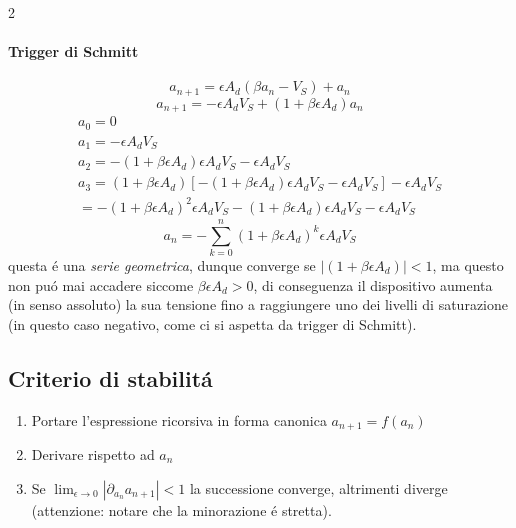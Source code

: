 \begin{multicols}{2}
  \paragraph{Trigger di Schmitt}
  \begin{equation*}
    a_{n+1} = \epsilon A_d(\beta a_n - V_S) + a_n
  \end{equation*}
  \begin{equation*}
    a_{n+1} = -\epsilon A_dV_S + (1 + \beta\epsilon A_d)a_n
  \end{equation*}
  \begin{equation*}
    \begin{gathered}
      a_0 = 0 \\
      a_1 = -\epsilon A_d V_S \\
      a_2 = -(1 + \beta \epsilon A_d)\epsilon A_d V_S - \epsilon A_d V_S \\
      a_3 = (1 + \beta \epsilon A_d)\left[-(1 + \beta \epsilon A_d)\epsilon A_d V_S - \epsilon A_d V_S\right] - \epsilon A_d V_S \\=
      -(1 + \beta\epsilon A_d)^2\epsilon A_d V_S - (1 + \beta\epsilon A_d)\epsilon A_d V_S - \epsilon A_d V_S
    \end{gathered}
  \end{equation*}
  \begin{equation*}
    a_n = -\sum_{k=0}^n(1 + \beta\epsilon A_d)^k\epsilon A_dV_S
  \end{equation*}
  questa \'e una \textit{serie geometrica}, dunque converge se $|(1 + \beta\epsilon A_d)| < 1$, ma questo non
  pu\'o mai accadere siccome $\beta\epsilon A_d > 0$, di conseguenza il dispositivo aumenta (in senso assoluto)
  la sua tensione fino a raggiungere uno dei livelli di saturazione (in questo caso negativo, come ci si aspetta
  da trigger di Schmitt).

  \subsection*{Criterio di stabilit\'a}
  \begin{enumerate}
  \item Portare l'espressione ricorsiva in forma canonica $a_{n+1} = f(a_n)$
  \item Derivare rispetto ad $a_n$
  \item Se $\lim_{\epsilon \to 0} |\partial_{a_n} a_{n+1}| < 1$ la successione converge, altrimenti
    diverge (attenzione: notare che la minorazione \'e stretta).
  \end{enumerate}


\end{multicols}
